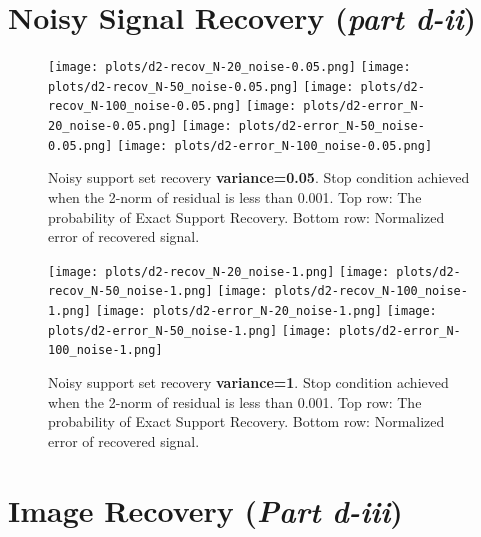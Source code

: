 \documentclass{article}
\begin{document}

\newpage
\section*{Noisy Signal Recovery ({\it part d-ii})}


\begin{figure}[H]
    \captionsetup{width=.75\linewidth}
    \centering
        \texttt{[image: plots/d2-recov\_N-20\_noise-0.05.png]}
        \texttt{[image: plots/d2-recov\_N-50\_noise-0.05.png]}
        \texttt{[image: plots/d2-recov\_N-100\_noise-0.05.png]}
        \newline
        \texttt{[image: plots/d2-error\_N-20\_noise-0.05.png]}
        \texttt{[image: plots/d2-error\_N-50\_noise-0.05.png]}
        \texttt{[image: plots/d2-error\_N-100\_noise-0.05.png]}
        \caption{Noisy support set recovery {\bf variance=0.05}. Stop condition achieved when the 2-norm of residual is less than 0.001. Top row: The probability of Exact Support Recovery. Bottom row: Normalized error of recovered signal.}
\end{figure}


\begin{figure}[H]
    \captionsetup{width=.75\linewidth}
    \centering
        \texttt{[image: plots/d2-recov\_N-20\_noise-1.png]}
        \texttt{[image: plots/d2-recov\_N-50\_noise-1.png]}
        \texttt{[image: plots/d2-recov\_N-100\_noise-1.png]}
        \newline
        \texttt{[image: plots/d2-error\_N-20\_noise-1.png]}
        \texttt{[image: plots/d2-error\_N-50\_noise-1.png]}
        \texttt{[image: plots/d2-error\_N-100\_noise-1.png]}
        \caption{Noisy support set recovery {\bf variance=1}. Stop condition achieved when the 2-norm of residual is less than 0.001. Top row: The probability of Exact Support Recovery. Bottom row: Normalized error of recovered signal.}
\end{figure}
















\newpage
\section*{Image Recovery ({\it Part d-iii})}
\end{document}
